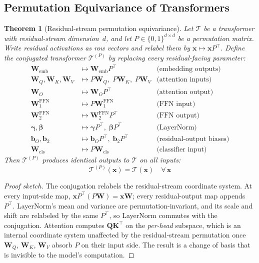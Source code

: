 \documentclass[11pt,a4paper]{article}
\newtheorem{theorem}{Theorem}
\newcommand{\bx}{\mathbf{x}}
\newcommand{\bW}{\mathbf{W}}
\newcommand{\bQ}{\mathbf{Q}}
\newcommand{\bK}{\mathbf{K}}
\begin{document}
\subsection{Permutation Equivariance of Transformers}
\label{sec:permutation-equivariance}

\begin{theorem}[Residual-stream permutation equivariance]
\label{thm:permutation-equivariance}
Let $\mathcal{T}$ be a transformer with residual-stream
dimension~$d$, and let $P \in \{0,1\}^{d \times d}$ be a
permutation matrix.  Write residual activations as row vectors and
relabel them by $\bx\mapsto\bx P^\top$.  Define the \emph{conjugated} transformer
$\mathcal{T}^{(P)}$ by replacing every residual-facing parameter:
\begin{align}
    \bW_{\mathrm{emb}} &\mapsto \bW_{\mathrm{emb}} P^\top
    & \text{(embedding outputs)} \label{eq:conj-emb} \\
    \bW_Q, \bW_K, \bW_V &\mapsto P\bW_Q, \;P\bW_K,\;
    P\bW_V
    & \text{(attention inputs)} \label{eq:conj-qkv} \\
    \bW_O &\mapsto \bW_O P^\top
    & \text{(attention output)} \label{eq:conj-out} \\
    \bW_1^{\mathrm{FFN}} &\mapsto P\bW_1^{\mathrm{FFN}}
    & \text{(FFN input)} \label{eq:conj-ffn1} \\
    \bW_2^{\mathrm{FFN}} &\mapsto \bW_2^{\mathrm{FFN}}P^\top
    & \text{(FFN output)} \label{eq:conj-ffn2} \\
    \boldsymbol{\gamma}, \boldsymbol{\beta} &\mapsto
    \boldsymbol{\gamma}P^\top, \; \boldsymbol{\beta}P^\top
    & \text{(LayerNorm)} \label{eq:conj-ln} \\
    \mathbf b_O,\mathbf b_2 &\mapsto
    \mathbf b_OP^\top,\;\mathbf b_2P^\top
    & \text{(residual-output biases)} \label{eq:conj-bias} \\
    \bW_{\mathrm{cls}} &\mapsto P\bW_{\mathrm{cls}}
    & \text{(classifier input)} \label{eq:conj-cls}
\end{align}
Then $\mathcal{T}^{(P)}$ produces identical outputs to
$\mathcal{T}$ on all inputs:
\begin{equation}
    \mathcal{T}^{(P)}(\bx) = \mathcal{T}(\bx)
    \quad \forall\, \bx
    \label{eq:equivariance}
\end{equation}
\end{theorem}

\begin{proof}[Proof sketch]
The conjugation relabels the residual-stream coordinate system.
At every input-side map, $\bx P^\top(P\bW)=\bx\bW$; every
residual-output map appends $P^\top$.  LayerNorm's mean and variance
are permutation-invariant, and its scale and shift are relabeled by
the same $P^\top$, so LayerNorm commutes with the conjugation.
Attention computes $\bQ\bK^\top$ on the \emph{per-head}
subspace, which is an internal coordinate system unaffected by
the residual-stream permutation once $\bW_Q$, $\bW_K$, $\bW_V$
absorb $P$ on their input side.  The result is a change
of basis that is invisible to the model's computation.
\end{proof}
\end{document}

